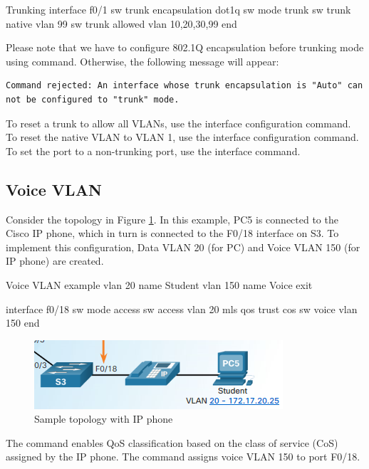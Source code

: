 \begin{sexylisting}{Trunking}
interface f0/1
  sw trunk encapsulation dot1q
  sw mode trunk
  sw trunk native vlan 99
  sw trunk allowed vlan 10,20,30,99
end
\end{sexylisting}

Please note that we have to configure 802.1Q encapsulation before trunking mode using  command. Otherwise, the following message will appear:

\begin{verbatim}
Command rejected: An interface whose trunk encapsulation is "Auto" can not be configured to "trunk" mode. 
\end{verbatim}

To reset a trunk to allow all VLANs, use the  interface configuration command. To reset the native VLAN to VLAN 1, use the  interface configuration command. To set the port to a non-trunking port, use the  interface command.

\subsection{Voice VLAN}

Consider the topology in Figure \ref{VoiceVLAN}. In this example, PC5 is connected to the Cisco IP phone, which in turn is connected to the F0/18 interface on S3. To implement this configuration, Data VLAN 20 (for PC) and Voice VLAN 150 (for IP phone) are created. 

\begin{sexylisting}{Voice VLAN example}
vlan 20
  name Student
vlan 150
  name Voice
exit

interface f0/18
  sw mode access
  sw access vlan 20
  mls qos trust cos
  sw voice vlan 150
end
\end{sexylisting}

\begin{figure}[hbtp]
\caption{Sample topology with IP phone}\label{VoiceVLAN}
\centering
\includegraphics[scale=0.6]{pictures/VoiceVLAN.PNG}
\end{figure}

The command  enables QoS classification based on the class of service (CoS) assigned by the IP phone. The command  assigns  voice VLAN 150 to port F0/18. 

